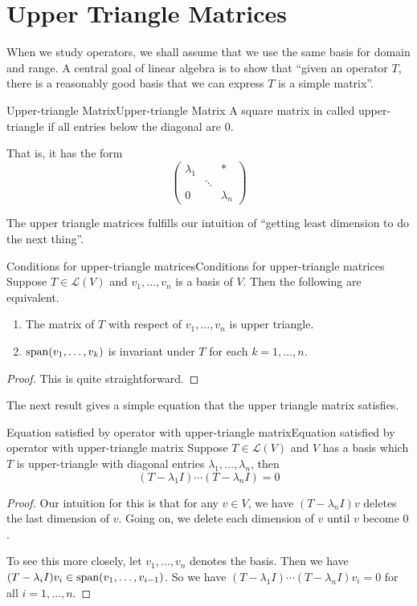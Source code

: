 \documentclass[../main.tex]{subfiles}
\begin{document}
\section{Upper Triangle Matrices}
When we study operators, we shall assume that we use the same basis for domain and range. A central goal of linear algebra is to show that ``given an operator $T$, there is a reasonably good basis that we can express $T$ is a simple matrix''.

\begin{definition}{Upper-triangle Matrix}{Upper-triangle Matrix}
A square matrix in called upper-triangle if all entries below the diagonal are $0$.
\end{definition}
That is, it has the form
\begin{equation*}
\begin{pmatrix}
	\lambda_1& &*\\
	&\ddots & \\
	0& &\lambda_n	 
\end{pmatrix}
\end{equation*}

The upper triangle matrices fulfills our intuition of ``getting least dimension to do the next thing''.
\begin{theorem}{Conditions for upper-triangle matrices}{Conditions for upper-triangle matrices}
Suppose $T\in \mathscr{L}(V)$ and $v_1, \ldots ,v_n$ is a basis of $V$. Then the following are equivalent.
\begin{enumerate}
	\item The matrix of $T$ with respect of $v_1, \ldots ,v_n$ is upper triangle.
	\item $\operatorname{span} (v_1, \ldots ,v_k)$ is invariant under  $T$ for each $k=1, \ldots ,n$.
\end{enumerate}
\end{theorem}
\begin{proof}
This is quite straightforward.
\end{proof}

The next result gives a simple equation that the upper triangle matrix satisfies.
\begin{theorem}{Equation satisfied by operator with upper-triangle matrix}{Equation satisfied by operator with upper-triangle matrix}
Suppose $T\in \mathscr{L}(V)$ and $V$ has a basis which $T$ is upper-triangle with diagonal entries $\lambda_1, \ldots ,\lambda_n$, then
\begin{equation}
	(T-\lambda_1 I) \cdots (T-\lambda_n I) = 0
\end{equation}
\end{theorem}
\begin{proof}
Our intuition for this is that for any $v\in V$, we have $(T-\lambda_n I)v$ deletes the last dimension of $v$. Going on, we delete each dimension of $v$ until $v$ become $0$.

To see this more closely, let $v_1, \ldots ,v_n$ denotes the basis. Then we have $(T-\lambda_iI)v_i \in \operatorname{span} (v_1, \ldots ,v_{i-1})$. So we have $(T-\lambda_1I)\cdots (T-\lambda_nI)v_i = 0$ for all $i=1, \ldots ,n$.
\end{proof}
\end{document}
